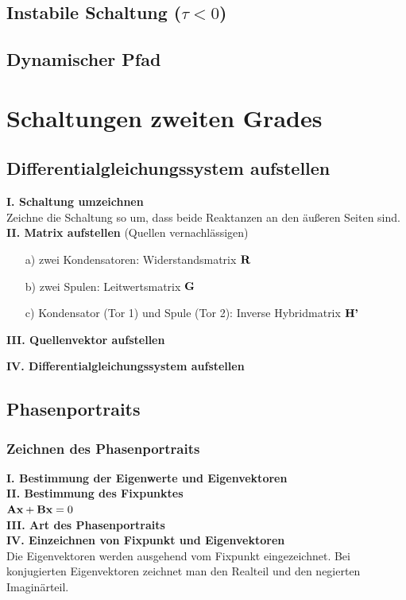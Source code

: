 \documentclass[fs, footer]{latex4ei}
\begin{document}
\begin{multicols*}{4}
\subsection{Instabile Schaltung ($\tau < 0$)}
\subsection{Dynamischer Pfad}
	
\section{Schaltungen zweiten Grades}
	\subsection{Differentialgleichungssystem aufstellen}
		\textbf{I. Schaltung umzeichnen}\\
		Zeichne die Schaltung so um, dass beide Reaktanzen an den äußeren Seiten sind.\\
		\textbf{II. Matrix aufstellen}
		(Quellen vernachlässigen)
		\begin{itemize}
		\item[a)] zwei Kondensatoren: Widerstandsmatrix $\textbf{R}$
		\item[b)] zwei Spulen: Leitwertsmatrix $\textbf{G}$
		\item[c)] Kondensator (Tor 1) und Spule (Tor 2): Inverse Hybridmatrix $\textbf{H'}$
		\end{itemize}
		
		\textbf{III. Quellenvektor aufstellen}
		
		\textbf{IV. Differentialgleichungssystem aufstellen}
	\subsection{Phasenportraits}
	\subsubsection{Zeichnen des Phasenportraits}
		\textbf{I. Bestimmung der Eigenwerte und Eigenvektoren}\\
		\textbf{II. Bestimmung des Fixpunktes}\\
		$\textbf{A}\textbf{x} + \textbf{B}\textbf{x} = 0$\\
		\textbf{III. Art des Phasenportraits}\\
		\textbf{IV. Einzeichnen von Fixpunkt und Eigenvektoren}\\
		Die Eigenvektoren werden ausgehend vom Fixpunkt eingezeichnet. Bei konjugierten Eigenvektoren zeichnet man den Realteil und den negierten Imaginärteil.\\

\end{multicols*}
\end{document}
